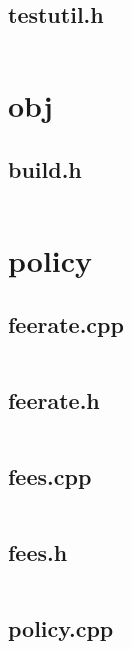 \documentclass{article}
\begin{document}
\subsection{testutil.h}
\inputminted{cpp}{/home/dufferzafar/dev/@clones/bitcoin/src/leveldb/util/testutil.h}
\newpage

\section{obj}

\subsection{build.h}
\inputminted{cpp}{/home/dufferzafar/dev/@clones/bitcoin/src/obj/build.h}
\newpage

\section{policy}

\subsection{feerate.cpp}
\inputminted{cpp}{/home/dufferzafar/dev/@clones/bitcoin/src/policy/feerate.cpp}
\newpage

\subsection{feerate.h}
\inputminted{cpp}{/home/dufferzafar/dev/@clones/bitcoin/src/policy/feerate.h}
\newpage

\subsection{fees.cpp}
\inputminted{cpp}{/home/dufferzafar/dev/@clones/bitcoin/src/policy/fees.cpp}
\newpage

\subsection{fees.h}
\inputminted{cpp}{/home/dufferzafar/dev/@clones/bitcoin/src/policy/fees.h}
\newpage

\subsection{policy.cpp}
\inputminted{cpp}{/home/dufferzafar/dev/@clones/bitcoin/src/policy/policy.cpp}
\newpage
\end{document}
